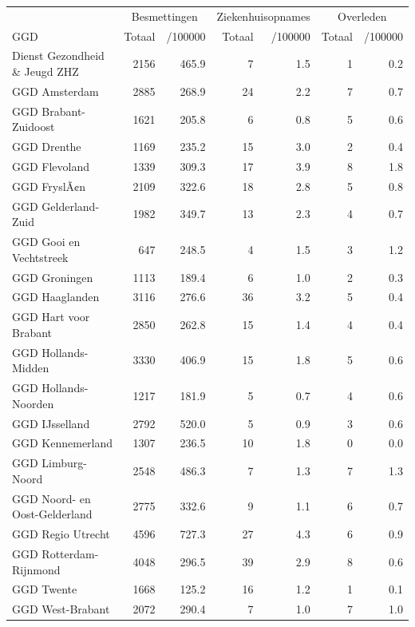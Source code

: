 \documentclass[
  english,
  man,floatsintext]{apa6}
\begin{document}
\begin{table}
\centering\begingroup\fontsize{10}{12}\selectfont

\begin{threeparttable}
\begin{tabular}{lrrrrrr}
\toprule
\multicolumn{1}{c}{ } & \multicolumn{2}{c}{Besmettingen} & \multicolumn{2}{c}{Ziekenhuisopnames} & \multicolumn{2}{c}{Overleden} \\
\cmidrule(l{3pt}r{3pt}){2-3} \cmidrule(l{3pt}r{3pt}){4-5} \cmidrule(l{3pt}r{3pt}){6-7}
GGD & Totaal & /100000 & Totaal & /100000 & Totaal & /100000\\
\midrule
Dienst Gezondheid \& Jeugd ZHZ & 2156 & 465.9 & 7 & 1.5 & 1 & 0.2\\
GGD Amsterdam & 2885 & 268.9 & 24 & 2.2 & 7 & 0.7\\
GGD Brabant-Zuidoost & 1621 & 205.8 & 6 & 0.8 & 5 & 0.6\\
GGD Drenthe & 1169 & 235.2 & 15 & 3.0 & 2 & 0.4\\
GGD Flevoland & 1339 & 309.3 & 17 & 3.9 & 8 & 1.8\\
GGD FryslÃ¢n & 2109 & 322.6 & 18 & 2.8 & 5 & 0.8\\
GGD Gelderland-Zuid & 1982 & 349.7 & 13 & 2.3 & 4 & 0.7\\
GGD Gooi en Vechtstreek & 647 & 248.5 & 4 & 1.5 & 3 & 1.2\\
GGD Groningen & 1113 & 189.4 & 6 & 1.0 & 2 & 0.3\\
GGD Haaglanden & 3116 & 276.6 & 36 & 3.2 & 5 & 0.4\\
GGD Hart voor Brabant & 2850 & 262.8 & 15 & 1.4 & 4 & 0.4\\
GGD Hollands-Midden & 3330 & 406.9 & 15 & 1.8 & 5 & 0.6\\
GGD Hollands-Noorden & 1217 & 181.9 & 5 & 0.7 & 4 & 0.6\\
GGD IJsselland & 2792 & 520.0 & 5 & 0.9 & 3 & 0.6\\
GGD Kennemerland & 1307 & 236.5 & 10 & 1.8 & 0 & 0.0\\
GGD Limburg-Noord & 2548 & 486.3 & 7 & 1.3 & 7 & 1.3\\
GGD Noord- en Oost-Gelderland & 2775 & 332.6 & 9 & 1.1 & 6 & 0.7\\
GGD Regio Utrecht & 4596 & 727.3 & 27 & 4.3 & 6 & 0.9\\
GGD Rotterdam-Rijnmond & 4048 & 296.5 & 39 & 2.9 & 8 & 0.6\\
GGD Twente & 1668 & 125.2 & 16 & 1.2 & 1 & 0.1\\
GGD West-Brabant & 2072 & 290.4 & 7 & 1.0 & 7 & 1.0\\

\end{tabular}
\end{threeparttable}
\end{table}
\end{document}
